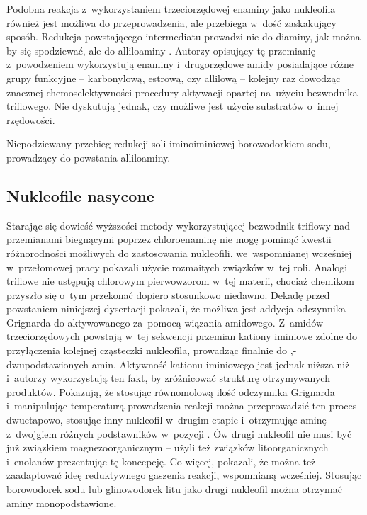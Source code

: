 Podobna reakcja z~wykorzystaniem trzeciorzędowej enaminy  jako nukleofila również jest możliwa do przeprowadzenia,
  ale przebiega w~dość zaskakujący sposób.
Redukcja powstającego intermediatu  prowadzi nie do diaminy,
  jak można by się spodziewać, ale do alliloaminy \autocite{huang18}.
Autorzy opisujący tę przemianię z~powodzeniem wykorzystują enaminy i~drugorzędowe amidy posiadające różne grupy funkcyjne \---
  karbonylową, estrową, czy allilową \--- kolejny raz dowodząc znacznej chemoselektywności procedury aktywacji opartej na~użyciu bezwodnika triflowego.
Nie dyskutują jednak, czy możliwe jest użycie substratów o~innej rzędowości.
\begin{scheme*}
  \centering
  
  \caption{
    Niepodziewany przebieg redukcji soli iminoiminiowej  borowodorkiem sodu,
    prowadzący do powstania alliloaminy.
  }
  \label{sch:allyloamine-synthesis}
\end{scheme*}

\subsection{Nukleofile nasycone}
Starając się dowieść wyższości metody wykorzystującej bezwodnik triflowy nad przemianami biegnącymi
  poprzez chloroenaminę nie mogę pominąć kwestii różnorodności możliwych do zastosowania nukleofili.
\citeauthor{ghosez69} we~wspomnianej wcześniej w~przełomowej pracy\autocite{ghosez69} pokazali użycie rozmaitych związków w~tej roli.
Analogi triflowe nie ustępują chlorowym pierwowzorom w~tej materii, chociaż chemikom przyszło się o~tym przekonać dopiero stosunkowo niedawno.
Dekadę przed powstaniem niniejszej dysertacji \citeauthor{xiao10} pokazali,
  że możliwa jest addycja odczynnika Grignarda do aktywowanego za~pomocą  wiązania amidowego\autocite{xiao10}.
Z~amidów trzeciorzędowych powstają w~tej sekwencji przemian kationy iminiowe zdolne do przyłączenia kolejnej cząsteczki nukleofila,
  prowadząc finalnie do \textalpha,\textalpha-dwupodstawionych amin.
Aktywność kationu iminiowego jest jednak niższa niż  i~autorzy wykorzystują ten fakt,
  by zróżnicować strukturę otrzymywanych produktów.
Pokazują, że stosując równomolową ilość odczynnika Grignarda i~manipulując temperaturą prowadzenia reakcji można przeprowadzić
  ten proces dwuetapowo, stosując inny nukleofil w~drugim etapie i~otrzymując aminę z~dwojgiem różnych podstawników w~pozycji \textalpha.
Ów drugi nukleofil nie musi być już związkiem magnezoorganicznym \---
  \citeauthor{xiao10} użyli też związków litoorganicznych i~enolanów prezentując tę koncepcję\autocite{xiao10}.
Co więcej, pokazali, że można też zaadaptować ideę reduktywnego gaszenia reakcji, wspomnianą wcześniej\autocite{belanger15}.
Stosując borowodorek sodu lub glinowodorek litu jako drugi nukleofil można otrzymać aminy monopodstawione\autocite{xiao10eurj}.


